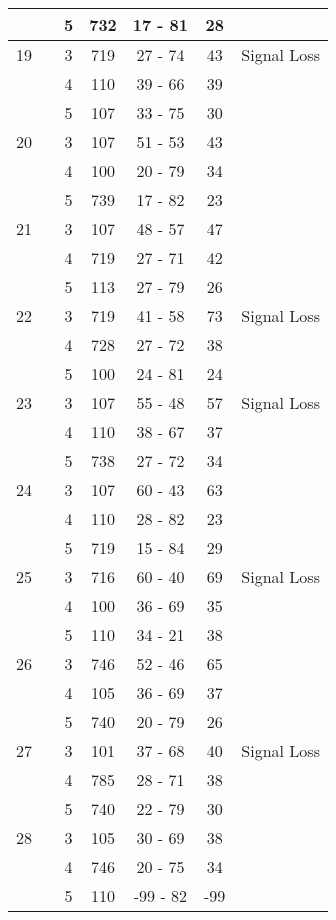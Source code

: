 \documentclass[a4paper,12pt]{article}
\begin{document}
\begin{tabular}{|c|c|c|c|c|c|c|}
 	&		&	 5	&	732	&	17 - 81	&	28	&		\\
\hline	
19	&		&	 3	&	719	&	27 - 74	&	43	& Signal Loss \\
 	&		&	 4	&	110	&	39 - 66	&	39	&		\\
 	&		&	 5	&	107	&	33 - 75	&	30	&		\\
\hline	
20	&		&	 3	&	107	&	51 - 53	&	43	& 		\\
 	&		&	 4	&	100	&	20 - 79	&	34	&		\\
 	&		&	 5	&	739	&	17 - 82	&	23	&		\\
\hline	
21	&		&	 3	&	107	&	48 - 57	&	47	&		\\
 	&		&	 4	&	719	&	27 - 71	&	42	&		\\
 	&		&	 5	&	113	&	27 - 79	&	26	&		\\
\hline	
22	&		&	 3	&	719	&	41 - 58	&	73	&Signal Loss \\
 	&		&	 4	&	728	&	27 - 72	&	38	&		\\
 	&		&	 5	&	100	&	24 - 81	&	24	&		\\
\hline	
23	&		&	 3	&	107	&	55 - 48	&	57	&Signal Loss \\
 	&		&	 4	&	110	&	38 - 67	&	37	&		\\
 	&		&	 5	&	738	&	27 - 72	&	34	&		\\
\hline	
24	&		&	 3	&	107	&	60 - 43	&	63	&	 	\\
 	&		&	 4	&	110	&	28 - 82	&	23	&		\\
 	&		&	 5	&	719	&	15 - 84	&	29	&		\\
\hline	
25	&		&	 3	&	716	&	60 - 40	&	69	&Signal Loss \\
 	&		&	 4	&	100	&	36 - 69	&	35	&		\\
 	&		&	 5	&	110	&	34 - 21	&	38	&		\\
\hline	
26	&		&	 3	&	746	&	52 - 46	&	65	&		\\
 	&		&	 4	&	105	&	36 - 69	&	37	&		\\
 	&		&	 5	&	740	&	20 - 79	&	26	&		\\
\hline	
27	&		&	 3	&	101	&	37 - 68	&	40	&Signal Loss \\
 	&		&	 4	&	785	&	28 - 71	&	38	&		\\
 	&		&	 5	&	740	&	22 - 79	&	30	&		\\
\hline	
28	&		&	 3	&	105	&	30 - 69	&	38	&		\\
 	&		&	 4	&	746	&	20 - 75	&	34	&		\\
 	&		&	 5	&	110	&	-99 - 82	&	-99	&		\\
\hline
\end{tabular}
\end{document}

